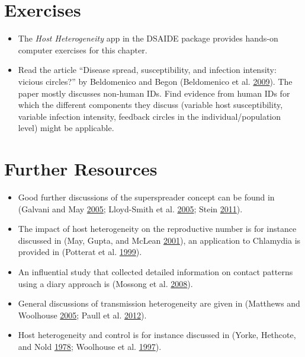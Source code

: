 \documentclass[]{book}
\providecommand{\tightlist}{%
  \setlength{\itemsep}{0pt}\setlength{\parskip}{0pt}}
\theoremstyle{definition}
\theoremstyle{definition}
\theoremstyle{definition}
\theoremstyle{remark}
\begin{document}
\section{Exercises}\label{exercises-9}

\begin{itemize}
\tightlist
\item
  The \emph{Host Heterogeneity} app in the DSAIDE package provides
  hands-on computer exercises for this chapter.
\item
  Read the article ``Disease spread, susceptibility, and infection
  intensity: vicious circles?'' by Beldomenico and Begon (Beldomenico et
  al. \protect\hyperlink{ref-beldomenico09}{2009}). The paper mostly
  discusses non-human IDs. Find evidence from human IDs for which the
  different components they discuss (variable host susceptibility,
  variable infection intensity, feedback circles in the
  individual/population level) might be applicable.
\end{itemize}

\section{Further Resources}\label{further-resources-9}

\begin{itemize}
\tightlist
\item
  Good further discussions of the superspreader concept can be found in
  (Galvani and May \protect\hyperlink{ref-galvani05}{2005}; Lloyd-Smith
  et al. \protect\hyperlink{ref-lloyd-smith05}{2005}; Stein
  \protect\hyperlink{ref-stein11}{2011}).
\item
  The impact of host heterogeneity on the reproductive number is for
  instance discussed in (May, Gupta, and McLean
  \protect\hyperlink{ref-may01}{2001}), an application to Chlamydia is
  provided in (Potterat et al.
  \protect\hyperlink{ref-potterat99}{1999}).
\item
  An influential study that collected detailed information on contact
  patterns using a diary approach is (Mossong et al.
  \protect\hyperlink{ref-mossong08}{2008}).
\item
  General discussions of transmission heterogeneity are given in
  (Matthews and Woolhouse \protect\hyperlink{ref-matthews05}{2005};
  Paull et al. \protect\hyperlink{ref-paull12}{2012}).
\item
  Host heterogeneity and control is for instance discussed in (Yorke,
  Hethcote, and Nold \protect\hyperlink{ref-yorke78}{1978}; Woolhouse et
  al. \protect\hyperlink{ref-woolhouse97}{1997}).
\end{itemize}
\end{document}
